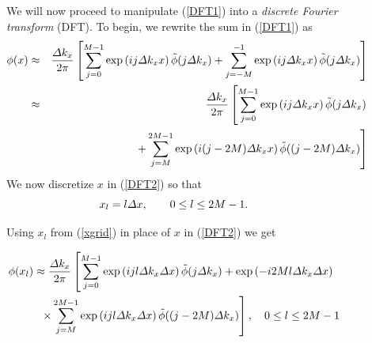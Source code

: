 \begin{figure}
{\begin{minipage} {142.0mm}
We will now proceed to manipulate (\ref{DFT1}) into a {\em discrete Fourier 
transform\/} (DFT). To begin, we rewrite the sum in (\ref{DFT1}) as
\begin{eqnarray} \label{DFT2}
 \phi   (x) &\approx& {\frac{{\mit \Delta} {  k}_{  
x}}{  2 \pi }}\left[{\sum\limits_{  j=0}^{  M-1} 
  \exp \left({ij {\mit \Delta} {  k}_{  x}  
x}\right)\tilde{ \phi }(j {\mit \Delta} {  k}_{  x}  
)+ \sum\limits_{  j=-M}^{  -1}   \exp \left({i j 
{\mit \Delta} {  k}_{  x}  x}\right)\tilde{ \phi }(j 
{\mit \Delta} {  k}_{  x}  )}\right]\nonumber\\
& \approx& {\frac{{\mit \Delta} {  k}_{  x}}{  2 \pi 
}}\left[\sum\limits_{  j=0}^{  M-1}   \exp 
\left({i j {\mit \Delta} {  k}_{  x}  x}\right)\tilde{ 
\phi }(j {\mit \Delta} {  k}_{  x}  ) \right.\nonumber\\
&&\qquad\qquad
\left.+ \sum\limits_{ 
 j=M}^{  2M-1}   \exp \left({i(j-2M) {\mit \Delta} {  
k}_{  x}  x}\right)\tilde{ \phi }((j-2M) {\mit \Delta} { 
 k}_{  x}  )\right]
\end{eqnarray} 
We now discretize $x$ in (\ref{DFT2}) so that
\begin{equation} \label{xgrid}
{x}_{l}=l {\mit {\mit \Delta}}  x,\qquad 0 \le  l \le  2M-1.
\end{equation}

Using  ${x}_{l}$ from (\ref{xgrid}) in place of $x$ in (\ref{DFT2}) we get
\begin{samepage}
\begin{eqnarray} \label{DFT3}
\lefteqn{ \phi   ({x}_{l}) \approx {\frac{{\mit \Delta} {  k}_{ 
 x}}{  2 \pi }}\left[\sum\limits_{  j=0}^{  
M-1}   \exp \left({ijl {\mit \Delta} {  k}_{  x}{\mit \Delta} 
  x}\right)\tilde{ \phi }(j {\mit \Delta} {  k}_{  
x}  )+\exp \left({-i2Ml {\mit \Delta} {  k}_{  x}{\mit \Delta} 
  x}\right)\right.}\nonumber\\
&&
\left.
\qquad
\times \sum\limits_{  j=M}^{  2M-1}   
\exp \left({ijl {\mit \Delta} {  k}_{  x}{\mit \Delta}   
x}\right)\tilde{ \phi }((j-2M) {\mit \Delta} {  k}_{  x}  )\right],
\quad  0 \le l \le 2M-1
\end{eqnarray} 
\end{samepage}

\vspace{3mm}
\end{minipage}
}
\end{figure}

